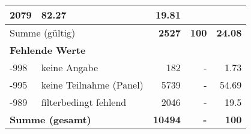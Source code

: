\begin{longtable}{lXrrr}
       \num{2079} &
       \num[round-mode=places,round-precision=2]{82,27} &
         \num[round-mode=places,round-precision=2]{19,81} \\
     \midrule
     \multicolumn{2}{l}{Summe (gültig)} &
       \textbf{\num{2527}} &
     \textbf{100} &
       \textbf{\num[round-mode=places,round-precision=2]{24,08}} \\
     \multicolumn{5}{l}{\textbf{Fehlende Werte}}\\
       -998 &
       keine Angabe &
         \num{182} &
        - &
         \num[round-mode=places,round-precision=2]{1,73} \\
       -995 &
       keine Teilnahme (Panel) &
         \num{5739} &
        - &
         \num[round-mode=places,round-precision=2]{54,69} \\
       -989 &
       filterbedingt fehlend &
         \num{2046} &
        - &
         \num[round-mode=places,round-precision=2]{19,5} \\
     \midrule
     \multicolumn{2}{l}{\textbf{Summe (gesamt)}} &
          \textbf{\num{10494}} &
        \textbf{-} &
        \textbf{100} \\
     \bottomrule
     \end{longtable}
     
